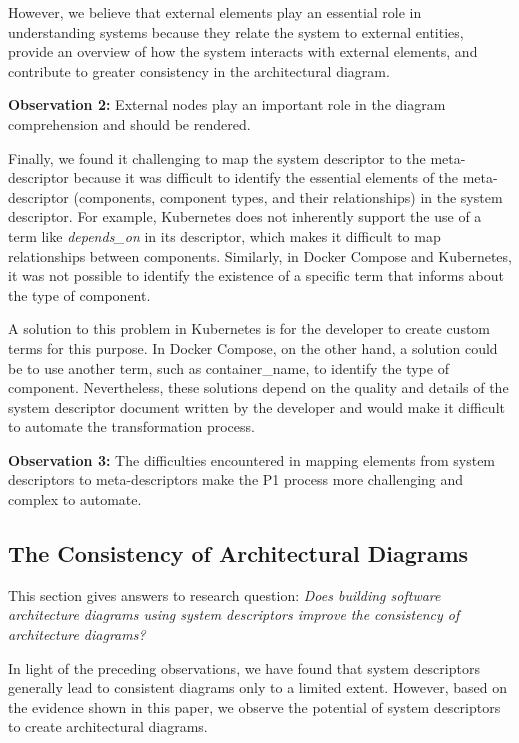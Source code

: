 \documentclass[sigconf]{acmart}
\begin{document}
However, we believe that external elements play an essential role in understanding systems because they relate the system to external entities, provide an overview of how the system interacts with external elements, and contribute to greater consistency in the architectural diagram.

\begin{tcolorbox}[colframe=gray!50, coltitle=black]
	\textbf{Observation 2: }External nodes play an important role in the diagram comprehension and should be rendered.
\end{tcolorbox}

Finally, we found it challenging to map the system descriptor to the meta-descriptor because it was difficult to identify the essential elements of the meta-descriptor (components, component types, and their relationships) in the system descriptor. For example, Kubernetes does not inherently support the use of a term like \textit{depends\_on} in its descriptor, which makes it difficult to map relationships between components. Similarly, in Docker Compose and Kubernetes, it was not possible to identify the existence of a specific term that informs about the type of component. 

A solution to this problem in Kubernetes is for the developer to create custom terms for this purpose. In Docker Compose, on the other hand, a solution could be to use another term, such as container\_name, to identify the type of component. Nevertheless, these solutions depend on the quality and details of the system descriptor document written by the developer and would make it difficult to automate the transformation process.

\begin{tcolorbox}[colframe=gray!50, coltitle=black]
	\textbf{Observation 3: }The difficulties encountered in mapping elements from system descriptors to meta-descriptors make the P1 process more challenging and complex to automate.
\end{tcolorbox}

\subsection{The Consistency of Architectural Diagrams}
This section gives answers to research question: \textit{Does building software architecture diagrams using system descriptors improve the consistency of architecture diagrams?}

In light of the preceding observations, we have found that system descriptors generally lead to consistent diagrams only to a limited extent. However, based on the evidence shown in this paper, we observe the potential of system descriptors to create architectural diagrams.
\end{document}
